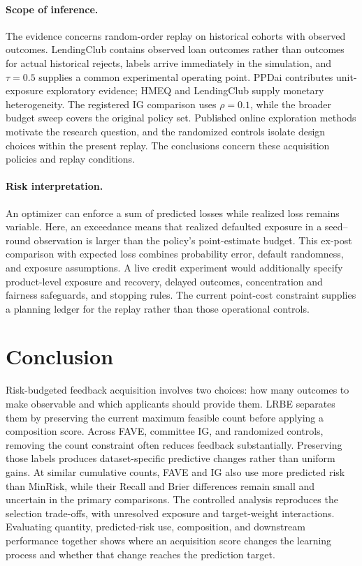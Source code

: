 \paragraph{Scope of inference.}
The evidence concerns random-order replay on historical cohorts with observed outcomes. LendingClub contains observed loan outcomes rather than outcomes for actual historical rejects, labels arrive immediately in the simulation, and $\tau=0.5$ supplies a common experimental operating point. PPDai contributes unit-exposure exploratory evidence; HMEQ and LendingClub supply monetary heterogeneity. The registered IG comparison uses $\rho=0.1$, while the broader budget sweep covers the original policy set. Published online exploration methods motivate the research question, and the randomized controls isolate design choices within the present replay. The conclusions concern these acquisition policies and replay conditions.

\paragraph{Risk interpretation.}
An optimizer can enforce a sum of predicted losses while realized loss remains variable. Here, an exceedance means that realized defaulted exposure in a seed--round observation is larger than the policy's point-estimate budget. This ex-post comparison with expected loss combines probability error, default randomness, and exposure assumptions. A live credit experiment would additionally specify product-level exposure and recovery, delayed outcomes, concentration and fairness safeguards, and stopping rules. The current point-cost constraint supplies a planning ledger for the replay rather than those operational controls.

\section{Conclusion}
\label{sec:conclusion}
Risk-budgeted feedback acquisition involves two choices: how many outcomes to make observable and which applicants should provide them. LRBE separates them by preserving the current maximum feasible count before applying a composition score. Across FAVE, committee IG, and randomized controls, removing the count constraint often reduces feedback substantially. Preserving those labels produces dataset-specific predictive changes rather than uniform gains. At similar cumulative counts, FAVE and IG also use more predicted risk than MinRisk, while their Recall and Brier differences remain small and uncertain in the primary comparisons. The controlled analysis reproduces the selection trade-offs, with unresolved exposure and target-weight interactions. Evaluating quantity, predicted-risk use, composition, and downstream performance together shows where an acquisition score changes the learning process and whether that change reaches the prediction target.
